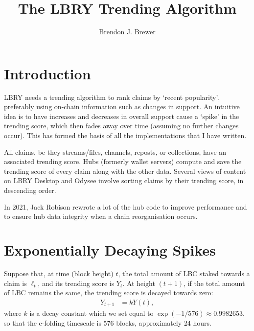 \documentclass[a4paper, 12pt]{article}
\title{The LBRY Trending Algorithm}
\author{Brendon J. Brewer}
\date{}
\begin{document}
\maketitle


\setlength{\parindent}{0pt}
\setlength{\parskip}{8pt}

\section{Introduction}
LBRY needs a trending algorithm to rank claims by `recent popularity',
preferably using on-chain information such as changes in support. An
intuitive idea is to have increases and decreases in overall support cause
a `spike' in the trending score, which then fades away over time
(assuming no further changes occur). This has formed the basis of all the
implementations that I have written.

All claims, be they streams/files, channels, reposts, or collections, have
an associated trending score. Hubs (formerly wallet servers) compute and
save the trending score of every claim along with the other data. Several
views of content on LBRY Desktop and Odysee involve sorting claims by their
trending score, in descending order.

In 2021, Jack Robison rewrote a lot of the hub code to improve performance
and to ensure hub data integrity when a chain reorganisation occurs.


\section{Exponentially Decaying Spikes}
Suppose that, at time (block height) $t$, the total amount of LBC staked
towards a claim is $\ell_t$, and its trending score is $Y_t$. At height
$(t+1)$, if the total amount of LBC remains the same, the trending score
is decayed towards zero:
\begin{align}
Y_{t+1} &= kY(t), \label{eqn:decay}
\end{align}
where $k$ is a decay constant which we set equal to
$\exp(-1/576) \approx 0.9982653$, so that the e-folding timescale is 576
blocks, approximately 24 hours.
\end{document}
